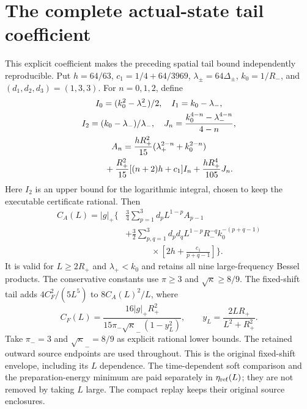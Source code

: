 \section{The complete actual-state tail coefficient}\label{app:tail-coefficient}
This explicit coefficient makes the preceding spatial tail bound
independently reproducible. Put $h=64/63$, $c_1=1/4+64/3969$,
$\lambda_\pm=64\Delta_\pm$, $k_0=1/R_-$,
and $(d_1,d_2,d_3)=(1,3,3)$. For $n=0,1,2$, define
\[
 \begin{gathered}
 I_0=(k_0^2-\lambda_-^2)/2,\quad I_1=k_0-\lambda_-,\\
 I_2=(k_0-\lambda_-)/\lambda_-,\quad
 J_n=\frac{k_0^{4-n}-\lambda_-^{4-n}}{4-n},\\
 A_n=\frac{hR_+^2}{15}(\lambda_+^{2-n}+k_0^{2-n})\\
 \hphantom{A_n=}+\frac{R_+^2}{15}[(n+2)h+c_1]I_n
       +\frac{hR_+^4}{105}J_n.
 \end{gathered}
\]
Here $I_2$ is an upper bound for the logarithmic integral, chosen to keep
the executable certificate rational. Then
\[
 \begin{aligned}
 C_A(L)=|g|_+\Bigg\{&\frac34\sum_{p=1}^3d_pL^{1-p}A_{p-1}\\
 &+\frac32\sum_{p,q=1}^3d_pd_qL^{1-p}R_-^{-q}
       k_0^{-(p+q-1)}\\
 &\hspace{3em}\times\left[2h+\frac{c_1}{p+q-1}\right]\Bigg\}.
 \end{aligned}
\]
It is valid for $L\ge2R_+$ and $\lambda_+<k_0$ and retains all nine
large-frequency Bessel products. The conservative constants use
$\pi\ge3$ and $\sqrt\kappa\ge8/9$. The fixed-shift tail adds
$4C_F^2/(5L^5)$ to $8C_A(L)^2/L$, where
\[
 C_F(L)=\frac{16|g|_+R_+^2}
 {15\pi_-\sqrt{\kappa}_-\,(1-y_L^2)},\qquad
 y_L=\frac{2LR_+}{L^2+R_+^2}.
\]
Take $\pi_-=3$ and $\sqrt{\kappa}_-=8/9$ as explicit rational lower bounds. The retained outward source endpoints are used throughout. This is the
original fixed-shift envelope, including its $L$ dependence.
The time-dependent soft comparison and the preparation-energy minimum
are paid separately in $\eta_{\rm ref}(L)$; they are not removed by taking
$L$ large. The compact replay keeps their original source enclosures.
